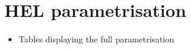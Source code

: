 \chapter{HEL parametrisation}\label{app:hel_parametrisation}

\begin{itemize}
    \item Tables displaying the full parametrisation
\end{itemize}